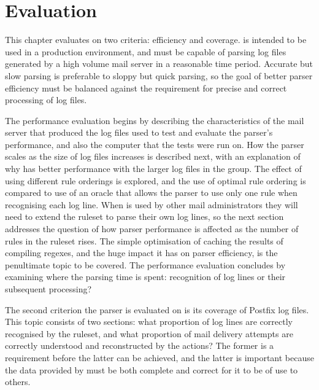\chapter{Evaluation}

\label{Evaluation}

\renewcommand{\figurename}{Graph}

\addtolength{\tabcolsep}{-2pt}

This chapter evaluates \parsername{} on two criteria: efficiency and
coverage.  \parsername{} is intended to be used in a production
environment, and must be capable of parsing log files generated by a high
volume mail server in a reasonable time period.  Accurate but slow parsing
is preferable to sloppy but quick parsing, so the goal of better parser
efficiency must be balanced against the requirement for precise and correct
processing of log files.

The performance evaluation begins by describing the characteristics of the
mail server that produced the log files used to test and evaluate the
parser's performance, and also the computer that the tests were run on.
How the parser scales as the size of log files increases is described next,
with an explanation of why \parsername{} has better performance with the
larger log files in the group.  The effect of using different rule
orderings is explored, and the use of optimal rule ordering is compared to
use of an oracle that allows the parser to use only one rule when
recognising each log line.  When \parsername{} is used by other mail
administrators they will need to extend the ruleset to parse their own log
lines, so the next section addresses the question of how parser performance
is affected as the number of rules in the ruleset rises.  The simple
optimisation of caching the results of compiling regexes, and the huge
impact it has on parser efficiency, is the penultimate topic to be covered.
The performance evaluation concludes by examining where the parsing time is
spent: recognition of log lines or their subsequent processing?

The second criterion the parser is evaluated on is its coverage of Postfix
log files.  This topic consists of two sections: what proportion of log
lines are correctly recognised by the ruleset, and what proportion of mail
delivery attempts are correctly understood and reconstructed by the
actions?  The former is a requirement before the latter can be achieved,
and the latter is important because the data provided by \parsername{} must
be both complete and correct for it to be of use to others.

